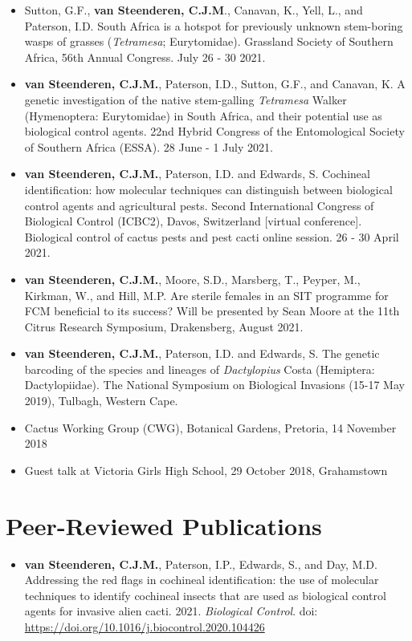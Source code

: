\documentclass{article}
\begin{document}
\begin{itemize}

\item Sutton, G.F., \textbf{van Steenderen, C.J.M}., Canavan, K., Yell, L., and Paterson, I.D. South Africa is a hotspot for previously unknown stem-boring wasps of grasses (\textit{Tetramesa}; Eurytomidae). Grassland Society of Southern Africa, 56th Annual Congress. July 26 - 30 2021. 
\item \textbf{van Steenderen, C.J.M.}, Paterson, I.D., Sutton, G.F., and Canavan, K. A genetic investigation of the native stem-galling \textit{Tetramesa} Walker (Hymenoptera: Eurytomidae) in South Africa, and their potential use as biological control agents. 22nd Hybrid Congress of the Entomological Society of Southern Africa (ESSA). 28 June - 1 July 2021.
\item \textbf{van Steenderen, C.J.M.}, Paterson, I.D. and Edwards, S. Cochineal identification: how molecular techniques can distinguish between biological control agents and agricultural pests. Second International Congress of Biological Control (ICBC2), Davos, Switzerland [virtual conference]. Biological control of cactus pests and pest cacti online session. 26 - 30 April 2021.
\item \textbf{van Steenderen, C.J.M.}, Moore, S.D., Marsberg, T., Peyper, M., Kirkman, W., and Hill, M.P. Are sterile females in an SIT programme for FCM beneficial to its success? Will be presented by Sean Moore at the 11th Citrus Research Symposium, Drakensberg, August 2021.
\item \textbf{van Steenderen, C.J.M.}, Paterson, I.D. and Edwards, S. The genetic barcoding of the species and lineages of \textit{Dactylopius} Costa (Hemiptera: Dactylopiidae). The National Symposium on Biological Invasions (15-17 May 2019), Tulbagh, Western Cape. 
\item Cactus Working Group (CWG), Botanical Gardens, Pretoria, 14 November 2018
\item Guest talk at Victoria Girls High School, 29 October 2018, Grahamstown
\end{itemize}

\section{Peer-Reviewed Publications}

\begin{itemize}


    \item \textbf{van Steenderen, C.J.M.}, Paterson, I.P., Edwards, S., and Day, M.D. Addressing the red flags in cochineal identification: the use of molecular techniques to identify cochineal insects that are used as biological control agents for invasive alien cacti. 2021. \textit{Biological Control}. doi: \url{https://doi.org/10.1016/j.biocontrol.2020.104426}
\end{itemize}
\end{document}

